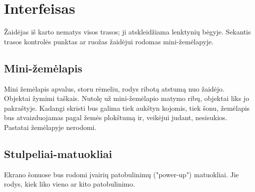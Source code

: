 \section{Interfeisas}

Žaidėjas iš karto nematys visos trasos; ji atskleidžiama lenktynių bėgyje.
Sekantis trasos kontrolės punktas ar ruožas žaidėjui rodomas mini-žemėlapyje.

\subsection{Mini-žemėlapis}

Mini žemėlapis apvalus, storu rėmeliu, rodys ribotą atstumą nuo žaidėjo.
Objektai žymimi taškais.
Nutolę už mini-žemėlapio matymo ribų, objektai liks jo pakraštyje.
Kadangi skristi bus galima tiek aukštyn kojomis, tiek šonu, žemėlapis bus atvaizduojamas pagal žemės plokštumą ir, veikėjui judant, nesisukios.
Pastatai žemėlapyje nerodomi.

\subsection{Stulpeliai-matuokliai}

Ekrano šonuose bus rodomi įvairių patobulinimų ("power-up") matuokliai.
Jie rodys, kiek liko vieno ar kito patobulinimo.
